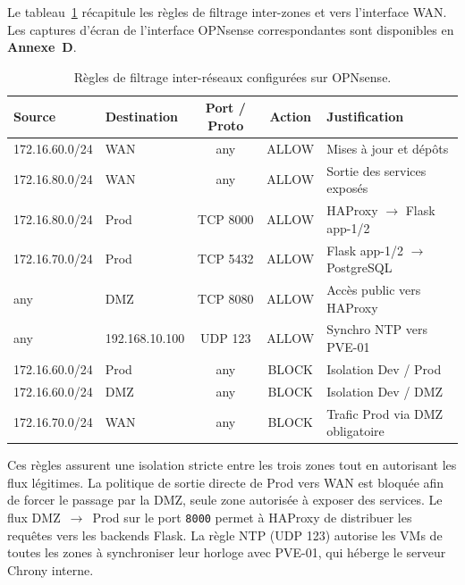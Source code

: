 \par Le tableau~\ref{tab:fw-opnsense-rules} récapitule les règles de
filtrage inter-zones et vers l'interface WAN. Les captures d'écran de
l'interface OPNsense correspondantes sont disponibles en \textbf{Annexe~D}.

\begin{table}[H]
\centering
\caption{Règles de filtrage inter-réseaux configurées sur OPNsense.}
\label{tab:fw-opnsense-rules}
\small
\begin{tabular}{|l|l|c|c|l|}
\hline
\textbf{Source} & \textbf{Destination} & \textbf{Port / Proto} & \textbf{Action} & \textbf{Justification} \\
\hline
172.16.60.0/24 & WAN            & any      & ALLOW & Mises à jour et dépôts \\
\hline
172.16.80.0/24 & WAN            & any      & ALLOW & Sortie des services exposés \\
\hline
172.16.80.0/24 & Prod           & TCP 8000 & ALLOW & HAProxy $\rightarrow$ Flask app-1/2 \\
\hline
172.16.70.0/24 & Prod           & TCP 5432 & ALLOW & Flask app-1/2 $\rightarrow$ PostgreSQL \\
\hline
any            & DMZ            & TCP 8080 & ALLOW & Accès public vers HAProxy \\
\hline
any            & 192.168.10.100 & UDP 123  & ALLOW & Synchro NTP vers PVE-01 \\
\hline
172.16.60.0/24 & Prod           & any      & BLOCK & Isolation Dev / Prod \\
\hline
172.16.60.0/24 & DMZ            & any      & BLOCK & Isolation Dev / DMZ \\
\hline
172.16.70.0/24 & WAN            & any      & BLOCK & Trafic Prod via DMZ obligatoire \\
\hline
\end{tabular}
\normalsize
\end{table}

\par Ces règles assurent une isolation stricte entre les trois zones tout en
autorisant les flux légitimes. La politique de sortie directe de Prod vers
WAN est bloquée afin de forcer le passage par la DMZ, seule zone autorisée
à exposer des services. Le flux DMZ~$\rightarrow$~Prod sur le port
\texttt{8000} permet à HAProxy de distribuer les requêtes vers les backends
Flask. La règle NTP (UDP 123) autorise les VMs de toutes les zones à
synchroniser leur horloge avec PVE-01, qui héberge le serveur Chrony
interne.\\

